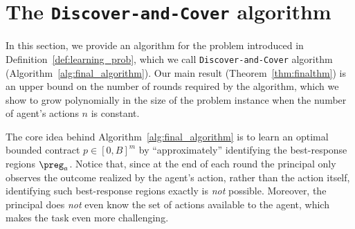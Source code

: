\section{The \texttt{Discover-and-Cover} algorithm}\label{sec:discover_and_partition}
In this section, we provide an algorithm for the problem introduced in Definition~\ref{def:learning_prob}, which we call \texttt{Discover-and-Cover} algorithm (Algorithm~\ref{alg:final_algorithm}).
%
Our main result (Theorem~\ref{thm:finalthm}) is an upper bound on the number of rounds required by the algorithm, which we show to grow polynomially in the size of the problem instance when the number of agent's actions $n$ is constant.
%


The core idea behind Algorithm~\ref{alg:final_algorithm} is to learn an optimal bounded contract $p   \in [0,B]^m$ by ``approximately'' identifying the best-response regions $\preg_a$.
%
Notice that, since at the end of each round the principal only observes the outcome realized by the agent's action, rather than the action itself, identifying such best-response regions exactly is \emph{not} possible.
%
Moreover, the principal does \emph{not} even know the set of actions available to the agent, which makes the task even more challenging.

